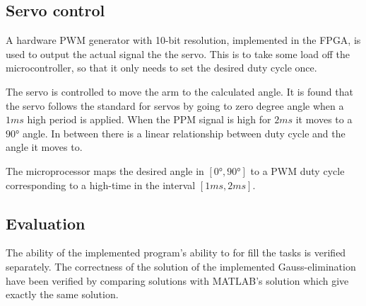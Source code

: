 \subsection{Servo control}
A hardware PWM generator with 10-bit resolution, implemented in the FPGA, is used to output the actual signal the the servo. This is to take some load off the microcontroller, so that it only needs to set the desired duty cycle once.

The servo is controlled to move the arm to the calculated angle. It is found that the servo follows the standard for servos by going to zero degree angle when a $1\si{ms}$ high period is applied. When the PPM signal is high for $2\si{ms}$ it moves to a $90\si{\degree}$ angle. In between there is a linear relationship between duty cycle and the angle it moves to.

The microprocessor maps the desired angle in $[0\si{\degree},90\si{\degree}]$ to a PWM duty cycle corresponding to a high-time in the interval $[1\si{ms},2\si{ms}]$.
%
\subsection{Evaluation}
The ability of the implemented program's ability to for fill the tasks is verified separately. The correctness of the solution of the implemented Gauss-elimination have been verified by comparing solutions with MATLAB's solution which give exactly the same solution.
